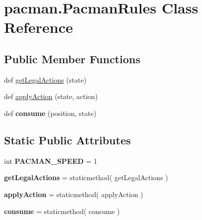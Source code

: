 \hypertarget{classpacman_1_1_pacman_rules}{}\section{pacman.\+Pacman\+Rules Class Reference}
\label{classpacman_1_1_pacman_rules}
\subsection*{Public Member Functions}
\begin{DoxyCompactItemize}
\item 
def \hyperlink{classpacman_1_1_pacman_rules_a515c73c403fdb8e7512bb9c587249477}{get\+Legal\+Actions} (state)
\item 
def \hyperlink{classpacman_1_1_pacman_rules_a8ba8b14554cc3631ad7ff93c973ba072}{apply\+Action} (state, action)
\item 
\mbox{\label{classpacman_1_1_pacman_rules_a034aebb68831db2f8731c370548e4394}} 
def {\bfseries consume} (position, state)
\end{DoxyCompactItemize}
\subsection*{Static Public Attributes}
\begin{DoxyCompactItemize}
\item 
\mbox{\label{classpacman_1_1_pacman_rules_a4deeb7c192985f7da2c210967f644a43}} 
int {\bfseries P\+A\+C\+M\+A\+N\+\_\+\+S\+P\+E\+ED} = 1
\item 
\mbox{\label{classpacman_1_1_pacman_rules_a523da7c010db12bdb53772a5fdb47916}} 
{\bfseries get\+Legal\+Actions} = staticmethod( get\+Legal\+Actions )
\item 
\mbox{\label{classpacman_1_1_pacman_rules_a703ce52c3a849ef9da084011e897d30f}} 
{\bfseries apply\+Action} = staticmethod( apply\+Action )
\item 
\mbox{\label{classpacman_1_1_pacman_rules_a921c71dafaa0ee0caf9827fa15c1f9d1}} 
{\bfseries consume} = staticmethod( consume )
\end{DoxyCompactItemize}



